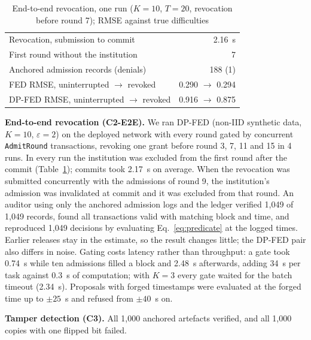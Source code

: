 \documentclass[pdflatex,iicol,sn-mathphys-num]{sn-jnl}
\theoremstyle{thmstyleone}
\newcommand{\CThreeClean}{1,000}
\newcommand{\CThreeDetected}{1,000}
\newcommand{\EtoeAuditDecisions}{1,049}
\newcommand{\EtoeAuditProofs}{1,049}
\newcommand{\EtoeAuditRecords}{1,049}
\newcommand{\EtoeCommitMean}{2.17}
\newcommand{\EtoeExampleCommit}{2.16}
\newcommand{\EtoeExampleDenied}{1}
\newcommand{\EtoeExampleDpAfter}{0.875}
\newcommand{\EtoeExampleDpBefore}{0.916}
\newcommand{\EtoeExampleExcluded}{7}
\newcommand{\EtoeExampleFedAfter}{0.294}
\newcommand{\EtoeExampleFedBefore}{0.290}
\newcommand{\EtoeExampleRecords}{188}
\newcommand{\EtoeExampleRound}{7}
\newcommand{\EtoeGateAfter}{2.48}
\newcommand{\EtoeGateBefore}{0.74}
\newcommand{\EtoeGateTotal}{34}
\newcommand{\EtoeOffline}{0.3}
\newcommand{\EtoeRaceReason}{was invalidated at commit}
\newcommand{\EtoeRaceRound}{9}
\newcommand{\EtoeRevokeRounds}{3, 7, 11 and 15}
\newcommand{\EtoeRounds}{20}
\newcommand{\EtoeRuns}{4}
\newcommand{\EtoeThreeGate}{2.34}
\newcommand{\TsAcceptedMax}{25}
\newcommand{\TsRejectedMin}{40}
\begin{document}
\begin{table}[t]
\centering
\caption{End-to-end revocation, one run ($K=10$, $T=\EtoeRounds$, revocation before round \EtoeExampleRound{}); RMSE against true difficulties}
\label{tab:etoe}
\footnotesize
\begin{tabular}{@{}p{}r@{}}
\toprule
Revocation, submission to commit & \EtoeExampleCommit{}~s \\
First round without the institution & \EtoeExampleExcluded{} \\
Anchored admission records (denials) & \EtoeExampleRecords{} (\EtoeExampleDenied{}) \\
FED RMSE, uninterrupted $\to$ revoked & \EtoeExampleFedBefore{} $\to$ \EtoeExampleFedAfter{} \\
DP-FED RMSE, uninterrupted $\to$ revoked & \EtoeExampleDpBefore{} $\to$ \EtoeExampleDpAfter{} \\
\bottomrule
\end{tabular}
\end{table}

\textbf{End-to-end revocation (C2-E2E).} We ran DP-FED (non-IID synthetic data, $K=10$, $\varepsilon=2$) on the deployed network with every round gated by concurrent \texttt{AdmitRound} transactions, revoking one grant before round \EtoeRevokeRounds{} in \EtoeRuns{} runs. In every run the institution was excluded from the first round after the commit (Table~\ref{tab:etoe}); commits took \EtoeCommitMean{}~s on average. When the revocation was submitted concurrently with the admissions of round \EtoeRaceRound{}, the institution's admission \EtoeRaceReason{} and it was excluded from that round. An auditor using only the anchored admission logs and the ledger verified \EtoeAuditProofs{} of \EtoeAuditRecords{} records, found all transactions valid with matching block and time, and reproduced \EtoeAuditDecisions{} decisions by evaluating Eq.~\eqref{eq:predicate} at the logged times. Earlier releases stay in the estimate, so the result changes little; the DP-FED pair also differs in noise. Gating costs latency rather than throughput: a gate took \EtoeGateBefore{}~s while ten admissions filled a block and \EtoeGateAfter{}~s afterwards, adding \EtoeGateTotal{}~s per task against \EtoeOffline{}~s of computation; with $K=3$ every gate waited for the batch timeout (\EtoeThreeGate{}~s). Proposals with forged timestamps were evaluated at the forged time up to $\pm\TsAcceptedMax$~s and refused from $\pm\TsRejectedMin$~s on.

\textbf{Tamper detection (C3).} All \CThreeClean{} anchored artefacts verified, and all \CThreeDetected{} copies with one flipped bit failed.
\end{document}
